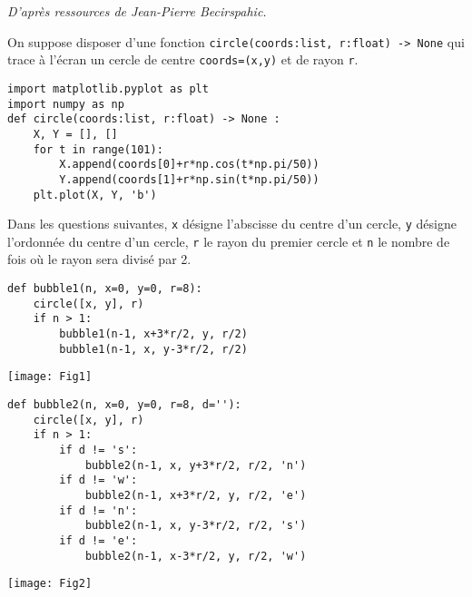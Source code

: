
\begin{flushright}
\footnotesize{\textit{D'après ressources de Jean-Pierre Becirspahic.}}
\end{flushright}
 On suppose disposer d’une fonction \texttt{circle(coords:list, r:float) -> None} qui trace à l’écran un cercle de centre 
 \texttt{coords=(x,y)} et de rayon \texttt{r}.
\ifprof\else
\begin{lstlisting}
import matplotlib.pyplot as plt
import numpy as np
def circle(coords:list, r:float) -> None :
    X, Y = [], []
    for t in range(101):
        X.append(coords[0]+r*np.cos(t*np.pi/50))
        Y.append(coords[1]+r*np.sin(t*np.pi/50))
    plt.plot(X, Y, 'b')
\end{lstlisting}
\fi


Dans les questions suivantes, \texttt{x} désigne l'abscisse du centre d'un cercle, \texttt{y} désigne l'ordonnée du centre d'un cercle, \texttt{r} le rayon du premier cercle et \texttt{n} le nombre de fois où le rayon sera divisé par 2. 
 
\ifprof
\begin{lstlisting}
def bubble1(n, x=0, y=0, r=8):
    circle([x, y], r)
    if n > 1:
        bubble1(n-1, x+3*r/2, y, r/2)
        bubble1(n-1, x, y-3*r/2, r/2)
\end{lstlisting}
\else
\begin{center}
\texttt{[image: Fig1]}
\end{center}
\fi

\ifprof
\begin{lstlisting}
def bubble2(n, x=0, y=0, r=8, d=''):
    circle([x, y], r)
    if n > 1:
        if d != 's':
            bubble2(n-1, x, y+3*r/2, r/2, 'n')
        if d != 'w':
            bubble2(n-1, x+3*r/2, y, r/2, 'e')
        if d != 'n':
            bubble2(n-1, x, y-3*r/2, r/2, 's')
        if d != 'e':
            bubble2(n-1, x-3*r/2, y, r/2, 'w')
\end{lstlisting}
\else
\begin{center}
\texttt{[image: Fig2]}
\end{center}
\fi
